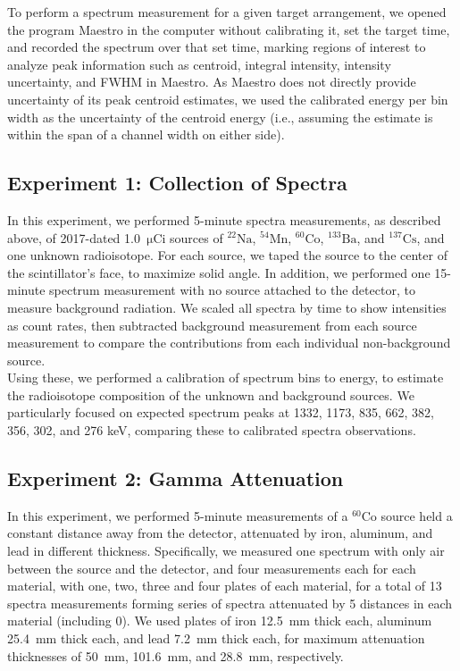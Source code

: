 \documentclass[12pt]{article}
\newcommand{\micCi}{\xspace$\mathrm{\mu Ci}$\xspace}
\newcommand{\CsSrc}{\xspace$\mathrm{^{137}Cs}$\xspace}
\newcommand{\NaSrc}{\xspace$\mathrm{^{22}Na}$\xspace}
\newcommand{\MnSrc}{\xspace$\mathrm{^{54}Mn}$\xspace}
\newcommand{\CoSrc}{\xspace$\mathrm{^{60}Co}$\xspace}
\newcommand{\BaSrc}{\xspace$\mathrm{^{133}Ba}$\xspace}
\begin{document}
To perform a spectrum measurement for a given target arrangement, we opened the program Maestro in the computer without calibrating it, set the target time, and recorded the spectrum over that set time, marking regions of interest to analyze peak information such as centroid, integral intensity, intensity uncertainty, and FWHM in Maestro.
As Maestro does not directly provide uncertainty of its peak centroid estimates, we used the calibrated energy per bin width as the uncertainty of the centroid energy (i.e., assuming the estimate is within the span of a channel width on either side).\\

\FloatBarrier
\subsection{Experiment 1: Collection of Spectra}
In this experiment, we performed 5-minute spectra measurements, as described above, of 2017-dated 1.0~\micCi sources of \NaSrc, \MnSrc, \CoSrc, \BaSrc, and \CsSrc, and one unknown radioisotope.
For each source, we taped the source to the center of the scintillator's face, to maximize solid angle.
In addition, we performed one 15-minute spectrum measurement with no source attached to the detector, to measure background radiation.
We scaled all spectra by time to show intensities as count rates, then subtracted background measurement from each source measurement to compare the contributions from each individual non-background source.\\

Using these, we performed a calibration of spectrum bins to energy, to estimate the radioisotope composition of the unknown and background sources.
We particularly focused on expected spectrum peaks at 1332, 1173, 835, 662, 382, 356, 302, and 276 keV, comparing these to calibrated spectra observations.

\subsection{Experiment 2: Gamma Attenuation}
In this experiment, we performed 5-minute measurements of a \CoSrc source held a constant distance away from the detector, attenuated by iron, aluminum, and lead in different thickness.
Specifically, we measured one spectrum with only air between the source and the detector, and four measurements each for each material, with one, two, three and four plates of each material, for a total of 13 spectra measurements forming series of spectra attenuated by 5 distances in each material (including 0). 
We used plates of iron 12.5~mm thick each, aluminum 25.4~mm thick each, and lead 7.2~mm thick each, for maximum attenuation thicknesses of 50~mm, 101.6~mm, and 28.8~mm, respectively.\\
\end{document}
